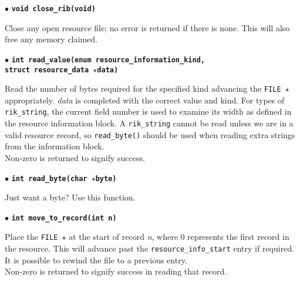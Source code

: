 \documentclass{article}
\begin{document}
  $\bullet$ \textbf{\texttt{void close\_rib(void)}} \newline

  \begin{minipage}[c]{10cm}
  Close any open resource file; no error is returned if there is none.  This
  will also free any memory claimed. \\
  \end{minipage}

  $\bullet$ \textbf{\texttt{int read\_value(enum resource\_information\_kind,}\\
     \hspace*{34mm}  \texttt{struct resource\_data $\star$data)}} \newline

  \begin{minipage}[c]{10cm}
  Read the number of bytes required for the specified kind advancing the 
  \texttt{FILE $\star$} appropriately.  \textit{data} is completed with the
  correct value and kind.  For types of \texttt{rik\_string}, the current
  field number is used to examine its width as defined in the resource 
  information block.  A \texttt{rik\_string} cannot
  be read unless we are in a valid resource record, so \texttt{read\_byte()}
  should be used when reading extra strings from the information block. \\

  Non-zero is returned to signify success. \\
  \end{minipage}

  $\bullet$ \textbf{\texttt{int read\_byte(char $\star$byte)}} \newline

  \begin{minipage}[c]{10cm}
  Just want a byte?  Use this function. \\
  \end{minipage}

  $\bullet$ \textbf{\texttt{int move\_to\_record(int n)}} \newline

  \begin{minipage}[c]{10cm}
    Place the \texttt{FILE $\star$} at the start of record \textit{n}, where
    0 represents the first record in the resource.  This will advance past
    the \texttt{resource\_info\_start} entry if required.  It is possible to
    rewind the file to a previous entry. \\
   
    Non-zero is returned to signify success in reading that record. \\
  \end{minipage}
\end{document}
